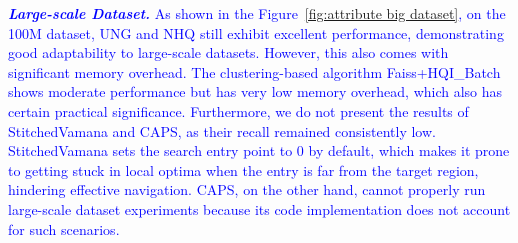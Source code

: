 \documentclass[sigconf, nonacm]{acmart}
\begin{document}
{{		%
	}
	
	\textit{\textbf{\textcolor{blue}{Large-scale Dataset.}}} 
	\textcolor{blue}{As shown in the Figure~\ref{fig:attribute big dataset}, on the 100M dataset, UNG and NHQ still exhibit excellent performance, demonstrating good adaptability to large-scale datasets. However, this also comes with significant memory overhead. The clustering-based algorithm Faiss+HQI\_Batch shows moderate performance but has very low memory overhead, which also has certain practical significance. Furthermore, we do not present the results of StitchedVamana and CAPS, as their recall remained consistently low. StitchedVamana sets the search entry point to 0 by default, which makes it prone to getting stuck in local optima when the entry is far from the target region, hindering effective navigation. CAPS, on the other hand, cannot properly run large-scale dataset experiments because its code implementation does not account for such scenarios.}
	
}
\end{document}
